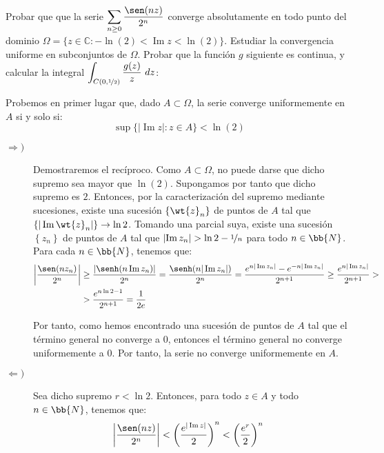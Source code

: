\documentclass[12pt]{article}
\renewcommand{\Im}{\operatorname{Im}}
\begin{document}
    \begin{ejercicio}[4 puntos]
        Probar que que la serie $\displaystyle \sum_{n\geq 0} \frac{\sen(nz)}{2^n}$ converge absolutamente en todo punto del dominio $\Omega=\{z \in \mathbb{C} : -\ln(2) < \Im z < \ln(2)\}$. Estudiar la convergencia uniforme en subconjuntos de $\Omega$. Probar que la función $g$ siguiente es continua, y calcular la integral $\displaystyle \int_{C(0,\nicefrac{1}{2})} \frac{g(z)}{z}\ dz$:

        Probemos en primer lugar que, dado $A\subset \Omega$, la serie converge uniformemente en $A$ si y solo si:
        \begin{equation*}
            \sup\{|\Im z| : z\in A\} < \ln(2)
        \end{equation*}
        \begin{description}
            \item[$\Longrightarrow)$] Demostraremos el recíproco. Como $A\subset \Omega$, no puede darse que dicho supremo sea mayor que $\ln(2)$. Supongamos por tanto que dicho supremo es $2$. Entonces, por la caracterización del supremo mediante sucesiones, existe una sucesión $\left\{\wt{z}_n\right\}$ de puntos de $A$ tal que $\left\{|\Im \wt{z}_n|\right\}\to \ln 2$. Tomando una parcial suya, existe una sucesión $\left\{z_n\right\}$ de puntos de $A$ tal que $\left|\Im z_n\right|>\ln 2 - \nicefrac{1}{n}$ para todo $n\in \bb{N}$.\\
            
            Para cada $n\in \bb{N}$, tenemos que:
            \begin{align*}
                \left|\dfrac{\sen(nz_n)}{2^n}\right| &\geq \dfrac{\left|\senh(n\Im z_n)\right|}{2^{n}}
                = \dfrac{\senh(n|\Im z_n|)}{2^{n}}
                = \dfrac{e^{n|\Im z_n|}-e^{-n|\Im z_n|}}{2^{n+1}} \geq \dfrac{e^{n|\Im z_n|}}{2^{n+1}}
                > \\
                &> \dfrac{e^{n\ln 2 -1}}{2^{n+1}}
                = \dfrac{1}{2e}
            \end{align*}

            Por tanto, como hemos encontrado una sucesión de puntos de $A$ tal que el término general no converge a $0$, entonces el término general no converge uniformemente a $0$. Por tanto, la serie no converge uniformemente en $A$.

            \item[$\Longleftarrow)$] Sea dicho supremo $r<\ln 2$. Entonces, para todo $z\in A$ y todo $n\in \bb{N}$, tenemos que:
            \begin{align*}
                \left|\dfrac{\sen(nz)}{2^n}\right| &<\left(\dfrac{e^{|\Im z|}}{2}\right)^n
                < \left(\dfrac{e^{r}}{2}\right)^n
            \end{align*}


\end{description}
\end{ejercicio}
\end{document}
